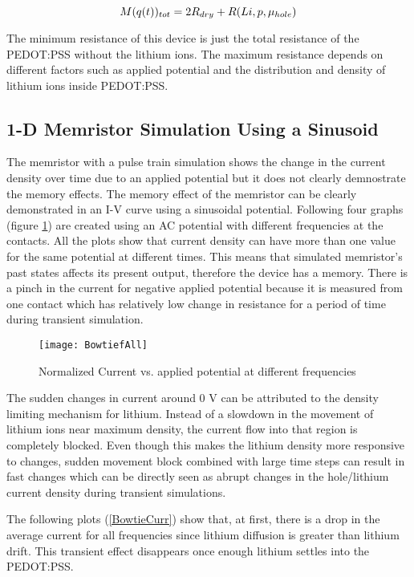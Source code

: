 \begin{doublespace}
\begin{equation}
\centering
M(q(t))_{tot}=2R_{dry}+R(Li,p,\mu_{hole})
\end{equation}

The minimum resistance of this device is just the total resistance of the PEDOT:PSS without the lithium ions. The maximum resistance depends on different factors such as applied potential and the distribution and density of lithium ions inside PEDOT:PSS.

\clearpage
\subsection{1-D Memristor Simulation Using a Sinusoid}

The memristor with a pulse train simulation shows the change in the current density over time due to an applied potential but it does not clearly demnostrate the memory effects. The memory effect of the memristor can be clearly demonstrated in an I-V curve using a sinusoidal potential. Following four graphs (figure \ref{Bowtie}) are created using an AC potential with different frequencies at the contacts. All the plots show that current density can have more than one value for the same potential at different times. This means that simulated memristor's past states affects its present output, therefore the device has a memory. There is a pinch in the current for negative applied potential because it is measured from one contact which has relatively low change in resistance for a period of time during transient simulation. 

\begin{figure}[!htp]
\centering
\texttt{[image: BowtiefAll]}
\caption{Normalized Current vs. applied potential at different frequencies} 
\label{Bowtie}
\end{figure}

The sudden changes in current around 0 V can be attributed to the density limiting mechanism for lithium. Instead of a slowdown in the movement of lithium ions near maximum density, the current flow into that region is completely blocked. Even though this makes the lithium density more responsive to changes, sudden movement block combined with large time steps can result in fast changes which can be directly seen as abrupt changes in the hole/lithium current density during transient simulations.  

The following plots (\ref{BowtieCurr}) show that, at first, there is a drop in the average current for all frequencies since lithium diffusion is greater than lithium drift. This transient effect disappears once enough lithium settles into the PEDOT:PSS. 


\end{doublespace}
